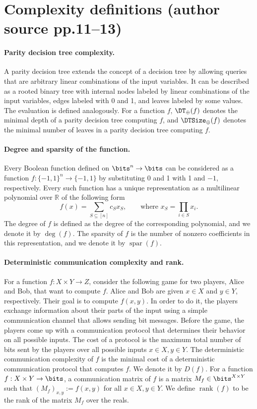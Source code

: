 \section*{Complexity definitions (author source pp.11--13)}
\paragraph{Parity decision tree complexity.} A parity decision tree extends the concept of a decision tree by allowing queries that are arbitrary linear combinations of the input variables. It can be described as a rooted binary tree with internal nodes labeled by linear combinations of the input variables, edges labeled with 0 and 1, and leaves labeled by some values. The evaluation is defined analogously. For a function $f$, $\DT_\oplus(f)$ denotes the minimal depth of a parity decision tree computing $f$, and $\DTSize_\oplus(f)$ denotes the minimal number of leaves in a parity decision tree computing $f$.
\paragraph{Degree and sparsity of the function.} Every Boolean function defined on $\bits^n\to\bits$ can be considered as a function $f:\{-1,1\}^n\to\{-1,1\}$ by substituting 0 and 1 with 1 and $-1$, respectively. Every such function has a unique representation as a multilinear polynomial over $\mathbb R$ of the following form
\[f(x)=\sum_{S\subseteq[n]}c_Sx_S,\qquad\text{where }x_S=\prod_{i\in S}x_i.\]
The degree of $f$ is defined as the degree of the corresponding polynomial, and we denote it by $\deg(f)$. The sparsity of $f$ is the number of nonzero coefficients in this representation, and we denote it by $\operatorname{spar}(f)$.
\paragraph{Deterministic communication complexity and rank.} For a function $f:X\times Y\to Z$, consider the following game for two players, Alice and Bob, that want to compute $f$. Alice and Bob are given $x\in X$ and $y\in Y$, respectively. Their goal is to compute $f(x,y)$. In order to do it, the players exchange information about their parts of the input using a simple communication channel that allows sending bit messages. Before the game, the players come up with a communication protocol that determines their behavior on all possible inputs. The cost of a protocol is the maximum total number of bits sent by the players over all possible inputs $x\in X,y\in Y$. The deterministic communication complexity of $f$ is the minimal cost of a deterministic communication protocol that computes $f$. We denote it by $D(f)$.
For a function $f:X\times Y\to\bits$, a communication matrix of $f$ is a matrix $M_f\in\bits^{X\times Y}$ such that $(M_f)_{x,y}:=f(x,y)$ for all $x\in X,y\in Y$. We define $\operatorname{rank}(f)$ to be the rank of the matrix $M_f$ over the reals.

